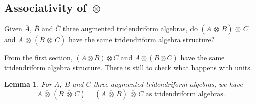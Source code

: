 \documentclass[pdftex]{sigma}
\numberwithin{equation}{section}
\theoremstyle{definition}
\theoremstyle{plain}
\newtheorem{Lemme}[defi]{Lemma}
\begin{document}
\subsection[Associativity of overline\{otimes\}]{Associativity of $\boldsymbol{\overline{\otimes}}$}

Given $\overline{A}$, $\overline{B}$ and $\overline{C}$ three augmented tridendriform algebras, do $(A\,\overline{\otimes}\, B)\,\overline{\otimes}\, C$ and $A\,\overline{\otimes}\,(B\,\overline{\otimes}\,C)$ have the same tridendriform algebra structure?

From the first section, $(A\otimes B)\otimes C$ and $A\otimes (B\otimes C)$ have the same tridendriform algebra structure. There is still to check what happens with units.

\begin{Lemme}\label{lem:tensassoaugm}
	For $\overline{A}$, $\overline{B}$ and $\overline{C}$ three augmented tridendriform algebras, we have
	\[
	A\,\overline{\otimes}\,(B\,\overline{\otimes}\, C)=(A\,\overline{\otimes}\,B)\,\overline{\otimes}\,C \text{ as tridendriform algebras.}
	\]
\end{Lemme}
\end{document}
